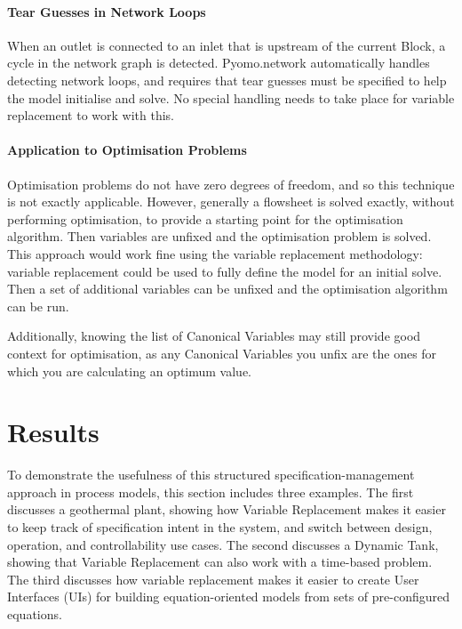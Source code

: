 \hypertarget{tear-guesses-in-network-loops}{%
\paragraph{Tear Guesses in Network
Loops}\label{tear-guesses-in-network-loops}}

When an outlet is connected to an inlet that is upstream of the current
Block, a cycle in the network graph is detected. Pyomo.network
automatically handles detecting network loops, and requires that tear
guesses must be specified to help the model initialise and solve. No
special handling needs to take place for variable replacement to work
with this.

\hypertarget{application-to-optimisation-problems}{%
\paragraph{Application to Optimisation
Problems}\label{application-to-optimisation-problems}}

Optimisation problems do not have zero degrees of freedom, and so this
technique is not exactly applicable. However, generally a flowsheet is
solved exactly, without performing optimisation, to provide a starting
point for the optimisation algorithm. Then variables are unfixed and the
optimisation problem is solved. This approach would work fine using the
variable replacement methodology: variable replacement could be used to
fully define the model for an initial solve. Then a set of additional
variables can be unfixed and the optimisation algorithm can be run.

Additionally, knowing the list of Canonical Variables may still provide good
context for optimisation, as any Canonical Variables you unfix are the ones
for which you are calculating an optimum value.


\hypertarget{case-studies}{%
\section{Results}\label{case-studies}}

To demonstrate the usefulness of this structured specification-management
approach in process models,
this section includes three examples.
The first discusses a geothermal plant, showing how Variable Replacement
makes it easier to keep track of specification intent in the
system, and switch between design, operation, and controllability use cases. 
The second discusses a Dynamic Tank, showing that Variable
Replacement can also work with a time-based problem. The third discusses how
variable replacement makes it easier to create User Interfaces (UIs) for
building equation-oriented models from sets of pre-configured equations.


